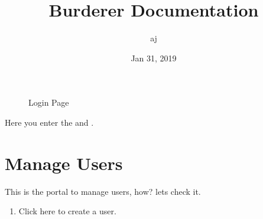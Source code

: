 \documentclass[letterpaper,10pt,english]{sphinxmanual}
\title{Burderer Documentation}
\date{Jan 31, 2019}
\author{aj}
\begin{document}
\maketitle
\sphinxtableofcontents
{}\label{\detokenize{index::doc}}


\begin{figure}[htbp]
\centering
\capstart

\noindent{}
\caption{Login Page}\label{\detokenize{index:id1}}\end{figure}

Here you enter the  and  .


\chapter{Manage Users}
\label{\detokenize{manageuser::doc}}\label{\detokenize{manageuser:welcome-to-burderer-s-documentation}}\label{\detokenize{manageuser:manage-users}}
\begin{figure}[htbp]
\centering

\noindent{}
\end{figure}

This is the portal to manage users, how? lets check it.
\begin{enumerate}
\item {} 
Click here to create a  user.

\end{enumerate}

\begin{figure}[htbp]
\centering

\noindent{}
\end{figure}
\end{document}
